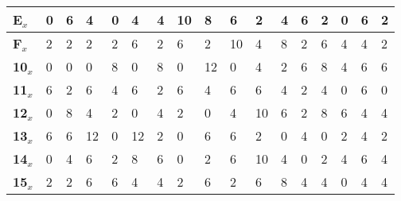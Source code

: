 \begin{longtable}[c]{|l|l|l|l|l|l|l|l|l|l|l|l|l|l|l|l|l|}
\textbf{E$_x$}  & 0              & 6              & 4              & 0              & 4              & 4              & 10             & 8              & 6              & 2              & 4              & 6              & 2              & 0              & 6              & 2              \\ \hline
\textbf{F$_x$}  & 2              & 2              & 2              & 2              & 6              & 2              & 6              & 2              & 10             & 4              & 8              & 2              & 6              & 4              & 4              & 2              \\ \hline
\textbf{10$_x$} & 0              & 0              & 0              & 8              & 0              & 8              & 0              & 12             & 0              & 4              & 2              & 6              & 8              & 4              & 6              & 6              \\ \hline
\textbf{11$_x$} & 6              & 2              & 6              & 4              & 6              & 2              & 6              & 4              & 6              & 6              & 4              & 2              & 4              & 0              & 6              & 0              \\ \hline
\textbf{12$_x$} & 0              & 8              & 4              & 2              & 0              & 4              & 2              & 0              & 4              & 10             & 6              & 2              & 8              & 6              & 4              & 4              \\ \hline
\textbf{13$_x$} & 6              & 6              & 12             & 0              & 12             & 2              & 0              & 6              & 6              & 2              & 0              & 4              & 0              & 2              & 4              & 2              \\ \hline
\textbf{14$_x$} & 0              & 4              & 6              & 2              & 8              & 6              & 0              & 2              & 6              & 10             & 4              & 0              & 2              & 4              & 6              & 4              \\ \hline
\textbf{15$_x$} & 2              & 2              & 6              & 6              & 4              & 4              & 2              & 6              & 2              & 6              & 8              & 4              & 4              & 0              & 4              & 4              \\ \hline

\end{longtable}
